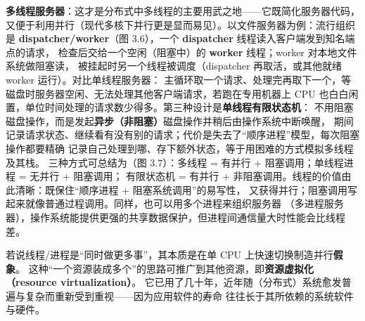 \medskip\noindent\textbf{多线程服务器}：这才是分布式中多线程的主要用武之地——它既简化服务器代码，
又便于利用并行（现代多核下并行更是显而易见）。以文件服务器为例：流行组织是
\textbf{dispatcher/worker}（图 3.6），一个 \textbf{dispatcher} 线程读入客户端发到知名端点的请求，
检查后交给一个空闲（阻塞中）的 \textbf{worker} 线程；worker 对本地文件系统做阻塞读，
被挂起时另一个线程被调度（dispatcher 再取活，或其他就绪 worker 运行）。对比单线程服务器：
主循环取一个请求、处理完再取下一个，等磁盘时服务器空闲、无法处理其他客户端请求，若跑在专用机器上
CPU 也白白闲置，单位时间处理的请求数少得多。第三种设计是\textbf{单线程有限状态机}：
不用阻塞磁盘操作，而是发起\textbf{异步（非阻塞）}磁盘操作并稍后由操作系统中断唤醒，
期间记录请求状态、继续看有没有别的请求；代价是失去了“顺序进程”模型，每次阻塞操作都要精确
记录自己处理到哪、存下额外状态，等于用困难的方式模拟多线程及其栈。
三种方式可总结为（图 3.7）：多线程 = 有并行 + 阻塞调用；单线程进程 = 无并行 + 阻塞调用；
有限状态机 = 有并行 + 非阻塞调用。线程的价值由此清晰：既保住“顺序进程 + 阻塞系统调用”的易写性，
又获得并行；阻塞调用写起来就像普通过程调用。同样，也可以用多个进程来组织服务器
（多进程服务器），操作系统能提供更强的共享数据保护，但进程间通信量大时性能会比线程差。

\begin{closeread}
\end{closeread}



若说线程/进程是“同时做更多事”，其本质是在单 CPU 上快速切换制造并行\textbf{假象}。
这种“一个资源装成多个”的思路可推广到其他资源，即\textbf{资源虚拟化（resource virtualization）}。
它已用了几十年，近年随（分布式）系统愈发普遍与复杂而重新受到重视——因为应用软件的寿命
往往长于其所依赖的系统软件与硬件。

